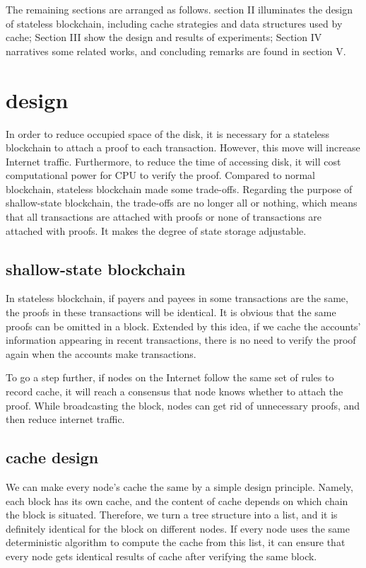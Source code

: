 \documentclass[conference]{IEEEtran}
\begin{document}
The remaining sections are arranged as follows.
section II illuminates the design of stateless blockchain,
including cache strategies and data structures
used by cache; Section III show the design and
results of experiments; Section IV narratives some related works,
and concluding remarks are found in section V.

\section{design}
In order to reduce occupied space of the disk, it is necessary for a stateless blockchain to attach a proof to each transaction. However, this move will increase Internet traffic. Furthermore, to reduce the time of accessing disk, it will cost computational power for CPU to verify the proof.
Compared to normal blockchain, stateless blockchain made some trade-offs. Regarding the purpose of shallow-state blockchain, the trade-offs are no longer all or nothing, which means that all transactions are attached with proofs or none of transactions are attached with proofs. It makes the degree of state storage adjustable.

\subsection{shallow-state blockchain}
In stateless blockchain, if payers and payees in some transactions are the same, the proofs in these transactions will be identical. It is obvious that the same proofs can be omitted in a block. Extended by this idea, if we cache the accounts’ information appearing in recent transactions, there is no need to verify the proof again when the accounts make transactions.

To go a step further, if nodes on the Internet follow the same set of rules to record cache, it will reach a consensus that node knows whether to attach the proof. While broadcasting the block, nodes can get rid of unnecessary proofs, and then reduce internet traffic.

\subsection{cache design}
We can make every node's cache the same by a simple design principle. Namely, each block has its own cache, and the content of cache depends on which chain the block is situated. Therefore, we turn a tree structure into a list, and it is definitely identical for the block on different nodes. If every node uses the same deterministic algorithm to compute the cache from this list, it can ensure that every node gets identical results of cache after verifying the same block.
\end{document}
